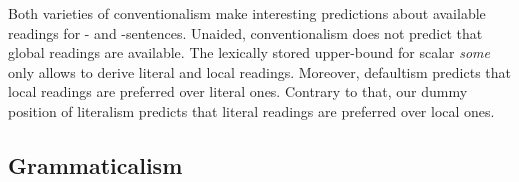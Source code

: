 \documentclass[fleqn,reqno,10pt,draft]{article}
\newcommand{\as}{\acro{as}}
\renewcommand{\es}{\acro{es}}
\begin{document}
Both varieties of conventionalism make interesting predictions about
available readings for \as- and \es-sentences. Unaided,
conventionalism does not predict that global readings are
available. The lexically stored upper-bound for scalar \emph{some}
only allows to derive literal and local readings. Moreover, defaultism
predicts that local readings are preferred over literal ones. Contrary
to that, our dummy position of literalism predicts that literal
readings are preferred over local ones.

\subsection{Grammaticalism}
\label{sec:grammaticalism}
\end{document}

